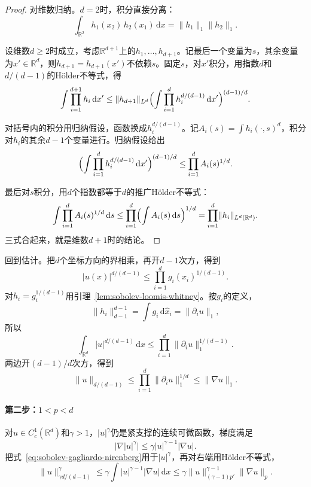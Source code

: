 \begin{proof}
对维数归纳。$d=2$时，积分直接分离：
\[
\int_{\mathbb R^2}h_1(x_2)\,h_2(x_1)\,\mathrm dx=\lVert h_1\rVert_1\lVert h_2\rVert_1 .
\]

设维数$d\geq2$时成立，考虑$\mathbb R^{d+1}$上的$h_1,\ldots,h_{d+1}$。记最后一个变量为$s$，其余变量为$x'\in\mathbb R^d$，则$h_{d+1}=h_{d+1}(x')$不依赖$s$。固定$s$，对$x'$积分，用指数$d$和$d/(d-1)$的Hölder不等式，得
\[
\int\prod_{i=1}^{d+1}h_i\,\mathrm dx'
\leq\lVert h_{d+1}\rVert_{L^d}\Bigl(\int\prod_{i=1}^dh_i^{d/(d-1)}\,\mathrm dx'\Bigr)^{(d-1)/d}.
\]

对括号内的积分用归纳假设，函数换成$h_i^{d/(d-1)}$。记$A_i(s)=\int h_i(\cdot,s)^d$，积分对$h_i$的其余$d-1$个变量进行。归纳假设给出
\[
\Bigl(\int\prod_{i=1}^dh_i^{d/(d-1)}\,\mathrm dx'\Bigr)^{(d-1)/d}\leq\prod_{i=1}^dA_i(s)^{1/d}.
\]

最后对$s$积分，用$d$个指数都等于$d$的推广Hölder不等式：
\[
\int\prod_{i=1}^dA_i(s)^{1/d}\,\mathrm ds\leq\prod_{i=1}^d\Bigl(\int A_i(s)\,\mathrm ds\Bigr)^{1/d}=\prod_{i=1}^d\lVert h_i\rVert_{L^d(\mathbb R^d)} .
\]
三式合起来，就是维数$d+1$时的结论。
\end{proof}

回到估计。把$d$个坐标方向的界相乘，再开$d-1$次方，得到
\[
|u(x)|^{d/(d-1)}\leq\prod_{i=1}^dg_i(\hat x_i)^{1/(d-1)} .
\]
对$h_i=g_i^{1/(d-1)}$用引理~\ref{lem:sobolev-loomis-whitney}。按$g_i$的定义，
\[
\lVert h_i\rVert_{d-1}^{d-1}=\int g_i\,\mathrm d\hat x_i=\lVert\partial_iu\rVert_1,
\]
所以
\[
\int_{\mathbb R^d}|u|^{d/(d-1)}\,\mathrm dx\leq\prod_{i=1}^d\lVert\partial_iu\rVert_1^{1/(d-1)} .
\]
两边开$(d-1)/d$次方，得到
\begin{equation}
\lVert u\rVert_{d/(d-1)}\leq\prod_{i=1}^d\lVert\partial_iu\rVert_1^{1/d}\leq\lVert\nabla u\rVert_1 .
\label{eq:sobolev-gagliardo-nirenberg}
\end{equation}

\paragraph{第二步：\texorpdfstring{$1<p<d$}{1<p<d}}
对$u\in C_c^1(\mathbb R^d)$和$\gamma>1$，$|u|^\gamma$仍是紧支撑的连续可微函数，梯度满足
\[
\bigl|\nabla|u|^\gamma\bigr|\leq\gamma|u|^{\gamma-1}|\nabla u| .
\]
把式~\eqref{eq:sobolev-gagliardo-nirenberg}用于$|u|^\gamma$，再对右端用Hölder不等式，
\[
\lVert u\rVert_{\gamma d/(d-1)}^\gamma
\leq\gamma\int|u|^{\gamma-1}|\nabla u|\,\mathrm dx
\leq\gamma\lVert u\rVert_{(\gamma-1)p'}^{\gamma-1}\lVert\nabla u\rVert_p .
\]

